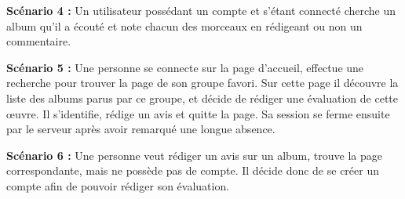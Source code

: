     \begin{paragraphe}
        \textbf{Scénario 4 :}
        Un utilisateur possédant un compte et s'étant connecté cherche un album qu'il
        a écouté et note chacun des morceaux en rédigeant ou non un commentaire.
    \end{paragraphe}

    \begin{paragraphe}
        \textbf{Scénario 5 :}
        Une personne se connecte sur la page d’accueil, effectue une recherche pour
        trouver la page de son groupe favori. Sur cette page il découvre la liste
        des albums parus par ce groupe, et décide de rédiger une évaluation de cette
        œuvre. Il s’identifie, rédige un avis et quitte la page. Sa session se
        ferme ensuite par le serveur après avoir remarqué une longue absence.
    \end{paragraphe}

    \begin{paragraphe}
        \textbf{Scénario 6 :}
        Une personne veut rédiger un avis sur un album, trouve la page
        correspondante, mais ne possède pas de compte. Il décide donc de se créer un
        compte afin de pouvoir rédiger son évaluation.
    \end{paragraphe}

